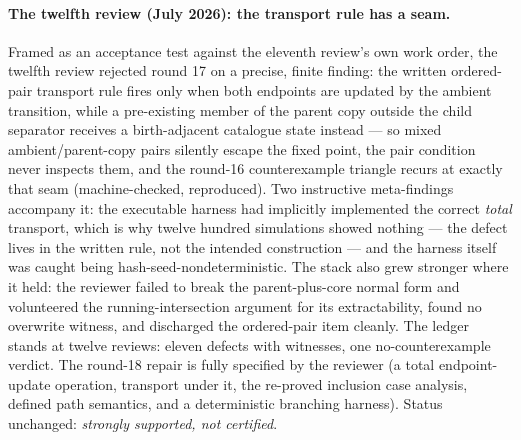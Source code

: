 \documentclass[
]{ceurart}
\theoremstyle{definition}
\begin{document}
\paragraph{The twelfth review (July 2026): the transport rule has a seam.}
Framed as an acceptance test against the eleventh review's own work
order, the twelfth review rejected round 17 on a precise, finite
finding: the written ordered-pair transport rule fires only when both
endpoints are updated by the ambient transition, while a pre-existing
member of the parent copy outside the child separator receives a
birth-adjacent catalogue state instead --- so mixed ambient/parent-copy
pairs silently escape the fixed point, the pair condition never
inspects them, and the round-16 counterexample triangle recurs at
exactly that seam (machine-checked, reproduced).  Two instructive
meta-findings accompany it: the executable harness had implicitly
implemented the correct \emph{total} transport, which is why twelve
hundred simulations showed nothing --- the defect lives in the written
rule, not the intended construction --- and the harness itself was
caught being hash-seed-nondeterministic.  The stack also grew stronger
where it held: the reviewer failed to break the parent-plus-core normal
form and volunteered the running-intersection argument for its
extractability, found no overwrite witness, and discharged the
ordered-pair item cleanly.  The ledger stands at twelve reviews: eleven
defects with witnesses, one no-counterexample verdict.  The round-18
repair is fully specified by the reviewer (a total endpoint-update
operation, transport under it, the re-proved inclusion case analysis,
defined path semantics, and a deterministic branching harness).
Status unchanged: \emph{strongly supported, not certified}.
\end{document}
